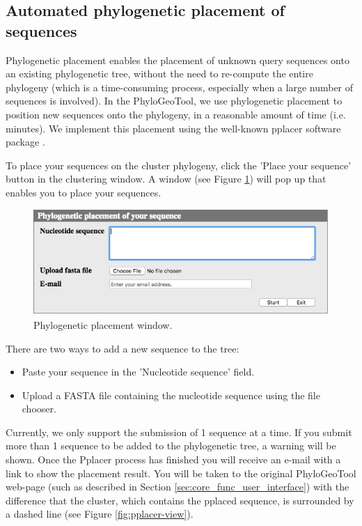 \documentclass[a4paper, 11pt]{article} %
\begin{document}
 
\subsection{Automated phylogenetic placement of sequences}
Phylogenetic placement enables the placement of unknown query sequences onto an existing phylogenetic tree, without the need to re-compute the entire phylogeny (which is a time-consuming process, especially when a large number of sequences is involved). 
In the PhyloGeoTool, we use phylogenetic placement to position new sequences onto the phylogeny, in a reasonable amount of time (i.e. minutes). 
We implement this placement using the well-known pplacer software package \cite{Matsen2010}.

To place your sequences on the cluster phylogeny, click the 'Place your sequence' button in the clustering window. 
A window (see Figure \ref{fig:pplacerwindow}) will pop up that enables you to place your sequences. 

\begin{figure}[H]
\centering
\includegraphics[scale=0.50]{images/pplacerWindow.png}
\vspace{-0.25cm}
\caption{Phylogenetic placement window.}
\label{fig:pplacerwindow}
\end{figure}

\noindent There are two ways to add a new sequence to the tree:
\begin{itemize}
\item Paste your sequence in the 'Nucleotide sequence' field.
\item Upload a FASTA file containing the nucleotide sequence using the file chooser.
\end{itemize}
Currently, we only support the submission of 1 sequence at a time.
If you submit more than 1 sequence to be added to the phylogenetic tree, a warning will be shown.
Once the Pplacer process has finished you will receive an e-mail with a link to show the placement result.
You will be taken to the original PhyloGeoTool web-page (such as described in Section \ref{sec:core_func_user_interface}) with the difference that the cluster, which contains the pplaced sequence, is surrounded by a dashed line (see Figure \ref{fig:pplacer-view}). 
\end{document}
